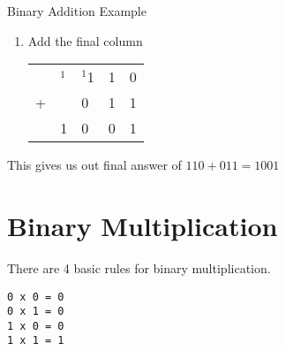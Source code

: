 \begin{example}{Binary Addition Example}
\begin{enumerate}
\begin{table}[H]
\begin{tabularx}{0.2\textwidth}{XXXXX}
        \end{tabularx}
    \end{table}
    \item Add the final column
    \begin{table}[H]
        \centering
        \begin{tabularx}{0.2\textwidth}{XXXXX}
             & $^1$ & $^1$1 & 1 & 0 \\
            + &  & 0 & 1 & 1 \\
            \hline
            & 1 & 0 & 0 & 1 
        \end{tabularx}
    \end{table}
\end{enumerate}
This gives us out final answer of $110+011 = 1001$
\end{example}

\section*{Binary Multiplication}
There are 4 basic rules for binary multiplication.
\begin{verbatim}
0 x 0 = 0
0 x 1 = 0
1 x 0 = 0 
1 x 1 = 1
\end{verbatim}

